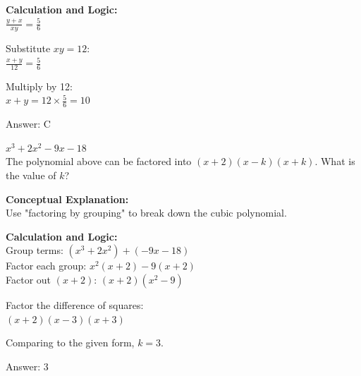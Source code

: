 \documentclass[11pt,paper=a4,answers]{exam}
\begin{document}
\begin{questions}
\begin{solution}
\vspace{20pt}

\textbf{Calculation and Logic:} \\
$\frac{y + x}{xy} = \frac{5}{6}$

\vspace{10pt}

Substitute $xy = 12$: \\
$\frac{x + y}{12} = \frac{5}{6}$

\vspace{10pt}

Multiply by 12: \\
$x + y = 12 \times \frac{5}{6} = 10$

\vspace{25pt}

Answer: \colorbox{yellow!100}{C}
\end{solution}

\vspace{40pt}

\question
$x^3 + 2x^2 - 9x - 18$ \\
The polynomial above can be factored into $(x + 2)(x - k)(x + k)$. What is the value of $k$?

\begin{solution}
\textbf{Conceptual Explanation:} \\
Use "factoring by grouping" to break down the cubic polynomial.

\vspace{20pt}

\textbf{Calculation and Logic:} \\
Group terms: $(x^3 + 2x^2) + (-9x - 18)$ \\
Factor each group: $x^2(x + 2) - 9(x + 2)$ \\
Factor out $(x + 2)$: $(x + 2)(x^2 - 9)$

\vspace{10pt}

Factor the difference of squares: \\
$(x + 2)(x - 3)(x + 3)$

\vspace{10pt}

Comparing to the given form, $k = 3$.

\vspace{25pt}

Answer: \colorbox{yellow!100}{3}
\end{solution}


\end{questions}
\end{document}
